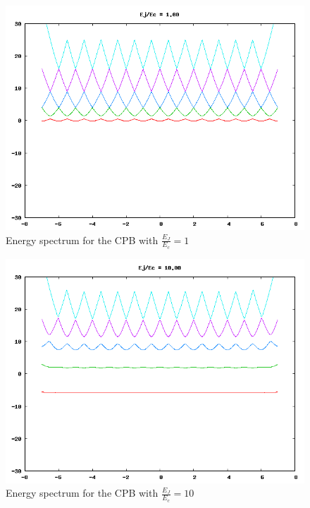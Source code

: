 \documentclass[twocolumn]{revtex4}
\newcommand{\picwidth}{0.66\linewidth}
\begin{document}
\begin{figure}
  \includegraphics[width=\picwidth]{CPB-1.png}
  \caption{Energy spectrum for the CPB with $\frac{E_J}{E_c}=1$}
  \label{cpb-1}
\end{figure}
\begin{figure}
  \includegraphics[width=\picwidth]{CPB-10.png}
  \caption{Energy spectrum for the CPB with $\frac{E_J}{E_c}=10$}
  \label{cpb-10}
\end{figure}
\end{document}
